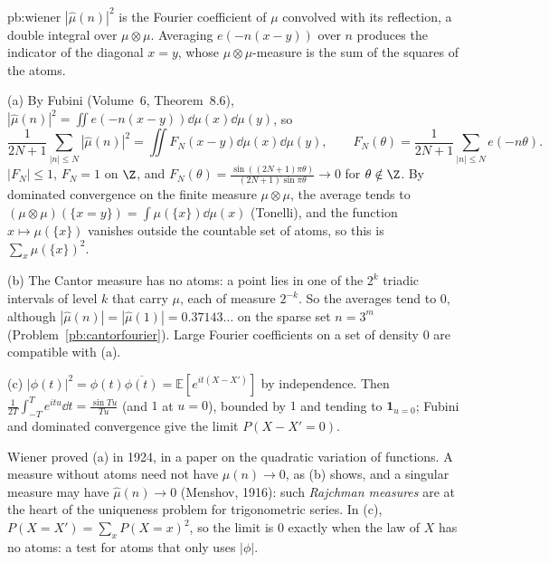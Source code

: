 \begin{solution}{pb:wiener}
\idea $|\hat\mu(n)|^2$ is the Fourier coefficient of $\mu$ convolved with its reflection, a double integral over $\mu\otimes\mu$. Averaging $e(-n(x-y))$ over $n$ produces the indicator of the diagonal
$x=y$, whose $\mu\otimes\mu$-measure is the sum of the squares of the atoms.

\writeup (a) By Fubini (Volume~6, Theorem~8.6), $|\hat\mu(n)|^2=\iint e(-n(x-y))\dd\mu(x)\dd\mu(y)$, so
\[
\frac1{2N+1}\sum_{|n|\le N}|\hat\mu(n)|^2=\iint F_N(x-y)\dd\mu(x)\dd\mu(y),\qquad F_N(\theta)=\frac1{2N+1}\sum_{|n|\le N}e(-n\theta).
\]
$|F_N|\le1$, $F_N=1$ on $\Z$, and $F_N(\theta)=\frac{\sin((2N+1)\pi\theta)}{(2N+1)\sin\pi\theta}\to0$ for $\theta\notin\Z$. By dominated convergence on the finite measure $\mu\otimes\mu$, the average
tends to $(\mu\otimes\mu)(\{x=y\})=\int\mu(\{x\})\dd\mu(x)$ (Tonelli), and the function $x\mapsto\mu(\{x\})$ vanishes outside the countable set of atoms, so this is $\sum_x\mu(\{x\})^2$.

(b) The Cantor measure has no atoms: a point lies in one of the $2^k$ triadic intervals of level $k$ that carry $\mu$, each of measure $2^{-k}$. So the averages tend to $0$, although
$|\hat\mu(n)|=|\hat\mu(1)|=0.37143\ldots$ on the sparse set $n=3^m$ (Problem~\ref{pb:cantorfourier}). Large Fourier coefficients on a set of density $0$ are compatible with (a).

(c) $|\phi(t)|^2=\phi(t)\overline{\phi(t)}=\mathbb E[e^{it(X-X')}]$ by independence. Then $\frac1{2T}\int_{-T}^Te^{itu}\dd t=\frac{\sin Tu}{Tu}$ (and $1$ at $u=0$), bounded by $1$ and tending to
$\mathbf 1_{u=0}$; Fubini and dominated convergence give the limit $P(X-X'=0)$.

\leads Wiener proved (a) in 1924, in a paper on the quadratic variation of functions. A measure without atoms need not have $\hat\mu(n)\to0$, as (b) shows, and a singular measure may
have $\hat\mu(n)\to0$ (Menshov, 1916): such \emph{Rajchman measures} are at the heart of the uniqueness problem for trigonometric series. In (c), $P(X=X')=\sum_xP(X=x)^2$, so the limit is $0$ exactly when the law of
$X$ has no atoms: a test for atoms that only uses $|\phi|$.
\end{solution}

